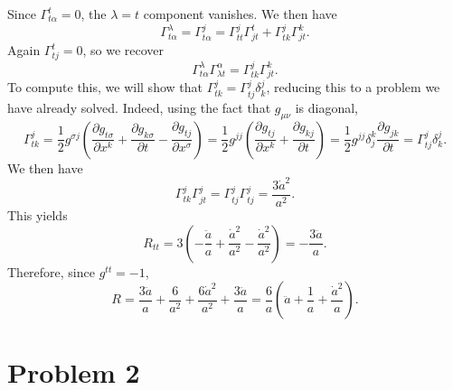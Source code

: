 \documentclass[11pt, letterpaper]{article}
\begin{document}
Since $\Gamma ^t_{t\alpha } =0$, the $\lambda =t$ component vanishes. We then have
\[
	\Gamma ^\lambda _{t\alpha } =\Gamma ^j_{t\alpha } =\Gamma ^j_{tt} \Gamma ^t_{jt} +\Gamma ^j_{tk} \Gamma ^k_{jt} 
.\]
Again $\Gamma ^t_{tj} =0$, so we recover
\[
	\Gamma ^\lambda _{t\alpha } \Gamma ^\alpha _{\lambda t} =\Gamma ^j_{tk} \Gamma ^k_{jt} 
.\]
To compute this, we will show that $\Gamma ^j_{tk} =\Gamma ^j_{tj}\delta ^j_k $, reducing this to a problem we have already solved. Indeed, using the fact that $g_{\mu \nu } $ is diagonal,
\[
	\Gamma ^j_{tk} =\frac{1}{2} g^{\sigma j} \left( \frac{\partial g_{t\sigma } }{\partial x^k} +\frac{\partial g_{k\sigma } }{\partial t} -\frac{\partial g_{tj} }{\partial x^\sigma }  \right) =\frac{1}{2} g^{jj} \left( \frac{\partial g_{tj} }{\partial x^k} +\frac{\partial g_{kj} }{\partial t}  \right) =\frac{1}{2} g^{jj} \delta _j^k \frac{\partial g_{jk} }{\partial t} =\Gamma ^j_{tj} \delta ^j_k
.\]
We then have
\[
	\Gamma ^j_{tk} \Gamma ^j_{jt} =\Gamma ^j_{tj} \Gamma ^j_{tj} =\frac{3 \dot{a} ^2}{a^2} 
.\]
This yields
\[
	R_{tt} =3\left( -\frac{\ddot{a} }{a} +\frac{\dot{a} ^2}{a^2} -\frac{\dot{a} ^2}{a^2}  \right) =-\frac{3 \ddot{a} }{a} 
.\]
Therefore, since $g^{tt} =-1$,
\[
	R=\frac{3 \ddot{a} }{a} +\frac{6}{a^2} +\frac{6 \dot{a} ^2}{a^2} +\frac{3 \ddot{a} }{a} =\frac{6}{a} \left( \ddot{a} +\frac{1}{a} +\frac{\dot{a} ^2}{a}  \right) 
.\]

\section{Problem 2}
\end{document}
